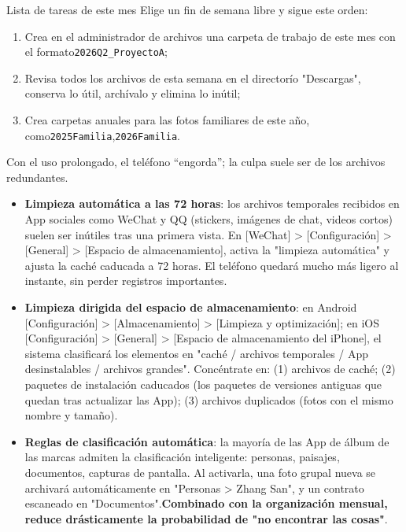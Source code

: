 \begin{tcbpractice}{Lista de tareas de este mes}
Elige un fin de semana libre y sigue este orden:

\begin{enumerate}
  \item Crea en el administrador de archivos una carpeta de trabajo de este mes con el formato\texttt{2026Q2\_ProyectoA};
  \item Revisa todos los archivos de esta semana en el directorío "Descargas", conserva lo útil, archívalo y elimina lo inútil;
  \item Crea carpetas anuales para las fotos familiares de este año, como\texttt{2025Familia},\texttt{2026Familia}.
\end{enumerate}

\end{tcbpractice}


Con el uso prolongado, el teléfono “engorda”; la culpa suele ser de los archivos redundantes.

\begin{itemize}
  \item \textbf{Limpieza automática a las 72 horas}: los archivos temporales recibidos en App sociales como WeChat y QQ (stickers, imágenes de chat, videos cortos) suelen ser inútiles tras una primera vista. En [WeChat] > [Configuración] > [General] > [Espacio de almacenamiento], activa la "limpieza automática" y ajusta la caché caducada a 72 horas. El teléfono quedará mucho más ligero al instante, sin perder registros importantes.
  \item \textbf{Limpieza dirigida del espacio de almacenamiento}: en Android [Configuración] > [Almacenamiento] > [Limpieza y optimización]; en iOS [Configuración] > [General] > [Espacio de almacenamiento del iPhone], el sistema clasificará los elementos en "caché / archivos temporales / App desinstalables / archivos grandes". Concéntrate en: (1) archivos de caché; (2) paquetes de instalación caducados (los paquetes de versiones antiguas que quedan tras actualizar las App); (3) archivos duplicados (fotos con el mismo nombre y tamaño).
  \item \textbf{Reglas de clasificación automática}: la mayoría de las App de álbum de las marcas admiten la clasificación inteligente: personas, paisajes, documentos, capturas de pantalla. Al activarla, una foto grupal nueva se archivará automáticamente en "Personas > Zhang San", y un contrato escaneado en "Documentos".\textbf{Combinado con la organización mensual, reduce drásticamente la probabilidad de "no encontrar las cosas"}.
\end{itemize}

